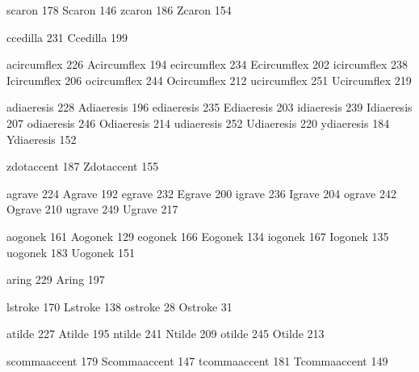  scaron           178
 Scaron           146
 zcaron           186
 Zcaron           154

 ccedilla         231
 Ccedilla         199

 acircumflex      226
 Acircumflex      194
 ecircumflex      234
 Ecircumflex      202
 icircumflex      238
 Icircumflex      206
 ocircumflex      244
 Ocircumflex      212
 ucircumflex      251
 Ucircumflex      219

 adiaeresis       228
 Adiaeresis       196
 ediaeresis       235
 Ediaeresis       203
 idiaeresis       239
 Idiaeresis       207
 odiaeresis       246
 Odiaeresis       214
 udiaeresis       252
 Udiaeresis       220
 ydiaeresis       184
 Ydiaeresis       152

 zdotaccent       187
 Zdotaccent       155

 agrave           224
 Agrave           192
 egrave           232
 Egrave           200
 igrave           236
 Igrave           204
 ograve           242
 Ograve           210
 ugrave           249
 Ugrave           217

 aogonek          161
 Aogonek          129
 eogonek          166
 Eogonek          134
 iogonek          167
 Iogonek          135
 uogonek          183
 Uogonek          151

 aring            229
 Aring            197

 lstroke          170
 Lstroke          138
 ostroke           28
 Ostroke           31

 atilde           227
 Atilde           195
 ntilde           241
 Ntilde           209
 otilde           245
 Otilde           213

 scommaaccent     179
 Scommaaccent     147
 tcommaaccent     181
 Tcommaaccent     149

\stopencoding

\endinput
